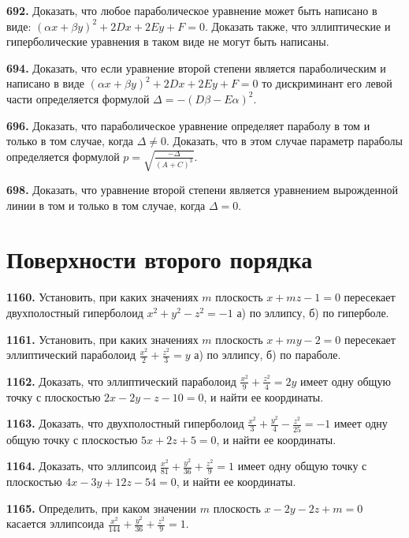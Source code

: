 \textbf{692.} Доказать, что любое параболическое уравнение может быть написано в виде: $(\alpha x+\beta y)^2+2 D x+2 E y+F=0$. Доказать также, что эллиптические и гиперболические уравнения в таком виде не могут быть написаны.

\textbf{694.} Доказать, что если уравнение второй степени является параболическим и написано в виде $(\alpha x+\beta y)^2+2 D x+2 E y+F=0$ то дискриминант его левой части определяется формулой $\Delta=-(D \beta-E \alpha)^2$.

\textbf{696.} Доказать, что параболическое уравнение определяет параболу в том и только в том случае, когда $\Delta \neq 0$. Доказать, что в этом случае параметр параболы определяется формулой $p=\sqrt{\frac{-\Delta}{(A+C)^3}}$.

\textbf{698.} Доказать, что уравнение второй степени является уравнением вырожденной линии в том и только в том случае, когда $\Delta=0$.



\section{Поверхности второго порядка}



\textbf{1160.} Установить, при каких значениях $m$ плоскость $x+m z-1=0$ пересекает двухполостный гиперболоид $x^2+y^2-z^2=-1$ а) по эллипсу, б) по гиперболе.

\textbf{1161.} Установить, при каких значениях $m$ плоскость $x+m y-2=0$ пересекает эллиптический параболоид $\frac{x^2}{2}+\frac{z^2}{3}=y$ а) по эллипсу, б) по параболе.

\textbf{1162.} Доказать, что эллиптический параболоид $\frac{x^2}{9}+\frac{z^2}{4}=2 y$ имеет одну общую точку с плоскостью $2 x-2 y-z-10=0$, и найти ее координаты.

\textbf{1163.} Доказать, что двухполостный гиперболоид $\frac{x^2}{3}+\frac{y^2}{4}-\frac{z^2}{25}=-1$ имеет одну общую точку с плоскостью $5 x+2 z+5=0$, и найти ее координаты.

\textbf{1164.} Доказать, что эллипсоид $\frac{x^2}{81}+\frac{y^2}{36}+\frac{z^2}{9}=1$ имеет одну общую точку с плоскостью $4 x-3 y+12 z-54=0$, и найти ее координаты.

\textbf{1165.} Определить, при каком значении $m$ плоскость $x-2 y-2 z+m=0$ касается эллипсоида $\frac{x^2}{144}+\frac{y^2}{36}+\frac{z^2}{9}=1$.